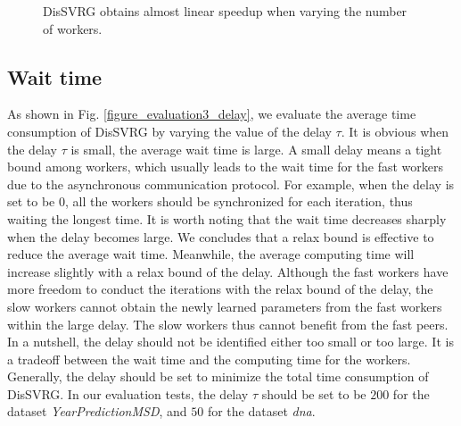 \documentclass[preprint,review,11pt,a4paper]{elsarticle}
\begin{document}
\begin{figure}
\centering
{}
\caption{DisSVRG obtains almost linear speedup when varying the number of workers.}
\label{figure_evaluation2_speedup}
\end{figure}

\subsection{Wait time}
As shown in Fig. \ref{figure_evaluation3_delay}, we evaluate the average time consumption of DisSVRG by varying the value of the delay $\tau$. It is obvious when the delay $\tau$ is small, the average wait time is large. A small delay means a tight bound among workers, which usually leads to the wait time for the fast workers due to the asynchronous communication protocol. For example, when the delay is set to be $0$, all the workers should be synchronized for each iteration, thus waiting the longest time. It is worth noting that the wait time decreases sharply when the delay becomes large. We concludes that a relax bound is effective to reduce the average wait time. Meanwhile, the average computing time will increase slightly with a relax bound of the delay. Although the fast workers have more freedom to conduct the iterations with the relax bound of the delay, the slow workers cannot obtain the newly learned parameters from the fast workers within the large delay. The slow workers thus cannot  benefit from the fast peers. In a nutshell, the delay should not be identified either too small or too large. It is a tradeoff between the wait time and the computing time for the workers. Generally, the delay should be set to minimize the total time consumption of DisSVRG. In our evaluation tests, the delay $\tau$ should be set to be  $200$ for the dataset \emph{YearPredictionMSD}, and $50$ for the dataset \emph{dna}.
\end{document}
